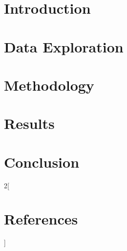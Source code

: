 \documentclass[NOTE, disdraft=true, UKenglish]{\DISCDTLATEXPATH UCLCDTDISdoc}
\begin{document}
\maketitle

\tableofcontents

\clearpage

\newpage
\section{Introduction}
\label{sec:introduction}


\section{Data Exploration}
\label{sec:data}


\section{Methodology}
\label{sec:methodology}


\section{Results}
\label{sec:results}


\section{Conclusion}
\label{sec:conclusion}


\nocite{*}
\begin{multicols}{2}[\section*{References}]
\printbibliography[heading=none]
\end{multicols}
\end{document}

